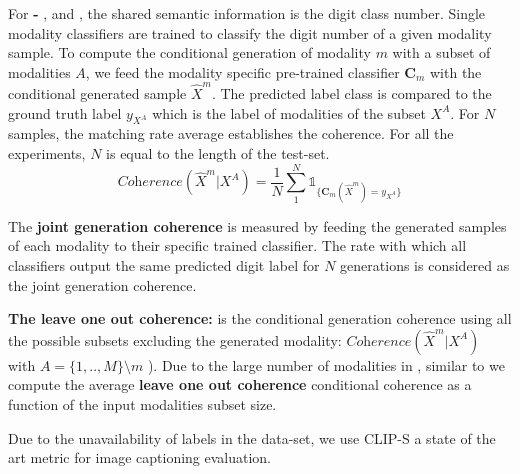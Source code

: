 For \textbf{\mnist-\svhn} , \textbf{\mhd}  and \textbf{\polymnist}, the shared semantic information is the digit class number. Single modality classifiers are trained to classify the digit number of a given modality sample. To compute the conditional generation of modality $m$ with a subset of modalities $A$, we feed the modality specific pre-trained classifier $\mathbf{C}_m$ with the conditional generated sample $\hat{X}^m$. The predicted label class is compared to the ground truth label $y_{X^{A}}$ which is the label of modalities of the subset $X^{A}$. For $N$ samples, the matching rate average establishes the coherence. For all the experiments, $N$ is equal to the length of the test-set.
\begin{equation}
    \textit{Coherence}( \hat{X}^m | X^{A}  ) = \frac{1}{N} \sum_1^N \mathds{1}_{ \{ \mathbf{C}_m ( \hat{X}^m) = y_{X^{A}} \}}  
\end{equation}

The \textbf{joint generation coherence} is measured by feeding the generated samples of each modality to their specific trained classifier. The rate with which all classifiers output the same predicted digit label for $N$ generations is considered as the joint generation coherence. 

\textbf{The leave one out coherence:} is the conditional generation coherence using all the possible subsets excluding the generated modality: $\textit{Coherence}( \hat{X}^m | X^A  )$ with $A= \{1,..,M \} \setminus m $ ).
Due to the large number of modalities in \textbf{\polymnist}, similar to  \cite{ sutter2021generalized, tcmvaehwang21,Daunhawer2021}  we compute the average \textbf{leave one out coherence} conditional coherence as a function of the input modalities subset size.


Due to the unavailability of labels in the \textbf{\cub} data-set, we use \gls{CLIP-S} \cite{hessel2021clipscore} a state of the art metric for image captioning evaluation.




